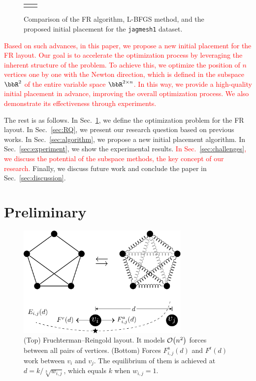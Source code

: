 \documentclass[dvipdfmx,journal]{IEEEtran}
\newcommand{\red}[1]{\textcolor{red}{#1}}
\begin{document}
\begin{figure}[t]
\begin{tabular}{cc}
\begin{minipage}{0.45\columnwidth}
        \end{minipage}
    \end{tabular}
    \caption{
        Comparison of the FR algorithm, L-BFGS method, and the proposed initial placement for the \texttt{jagmesh1} dataset.}
    \label{table:four_images}
\end{figure}

\red{
    Based on such advances, in this paper, we propose a new initial placement for the FR layout.
    Our goal is to accelerate the optimization process by leveraging the inherent structure of the problem.
    To achieve this, we optimize the position of $n$ vertices one by one with the Newton direction, which is defined in the subspace $\bbR^2$ of the entire variable space $\bbR^{2 \times n}$.
    In this way, we provide a high-quality initial placement in advance, improving the overall optimization process.
    We also demonstrate its effectiveness through experiments.
}

The rest is as follows.
In Sec.~\ref{sec:preliminary}, we define the optimization problem for the FR layout.
In Sec.~\ref{sec:RQ}, we present our research question based on previous works.
In Sec.~\ref{sec:algorithm}, we propose a new initial placement algorithm.
In Sec.~\ref{sec:experiment}, we show the experimental results.
\red{In Sec.~\ref{sec:challenges}, we discuss the potential of the subspace methods, the key concept of our research.}
Finally, we discuss future work and conclude the paper in Sec.~\ref{sec:discussion}.

\section{Preliminary}\label{sec:preliminary}

\begin{figure}[t]
    \centering
    \includegraphics[height=5.5cm]{fr_layout/fr_layout.pdf}
    \caption{
        (Top) Fruchterman--Reingold layout. It models $\order{n^2}$ forces between all pairs of vertices.
        (Bottom) Forces $F_{i,j}^\mathrm{a}(d)$ and $F^\mathrm{r}(d)$ work between $v_i$ and $v_j$. The equilibrium of them is achieved at $d = k/\sqrt[3]{w_{i,j}}$, which equals $k$ when $w_{i,j} = 1$.
    }
    \label{fig:frLayout}
\end{figure}
\end{document}
